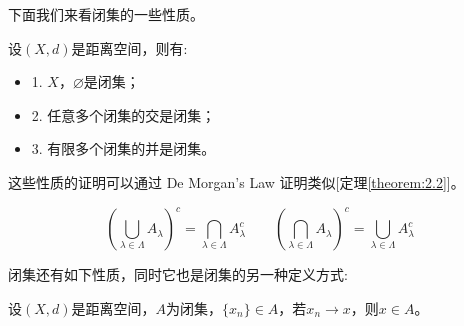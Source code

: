 下面我们来看闭集的一些性质。
\begin{theorem}
设$(X,d)$是距离空间，则有:
\begin{itemize}
\item 1. $X$，$\varnothing$是闭集；
\item 2. 任意多个闭集的交是闭集；
\item 3. 有限多个闭集的并是闭集。
\end{itemize}
\end{theorem}

这些性质的证明可以通过 De Morgan's Law 证明类似[定理\ref{theorem:2.2}]。
\begin{theorem}
\[\left(\bigcup\limits_{\lambda \in \Lambda}A_{\lambda}\right)^c=\bigcap\limits_{\lambda \in \Lambda}A_{\lambda}^c \qquad \left(\bigcap\limits_{\lambda \in \Lambda}A_{\lambda}\right)^c=\bigcup\limits_{\lambda \in \Lambda}A_{\lambda}^c\]
\end{theorem}

闭集还有如下性质，同时它也是闭集的另一种定义方式:
\begin{theorem}
    设$(X,d)$是距离空间，$A$为闭集，$\{x_n\} \in A$，若$x_n \rightarrow x$，则$x \in A$。
\end{theorem}

